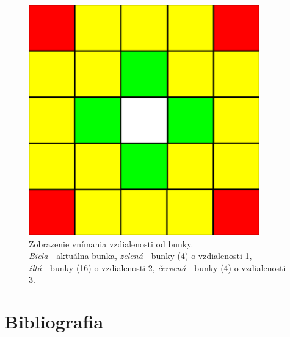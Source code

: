 \documentclass[a4paper,12pt]{article}
\begin{document}
\begin{figure}[htp]
    \centering
    \includegraphics[width=10cm]{neighbor_radius.png}
    \captionsetup{justification=centering,margin=2cm}
    \caption{Zobrazenie vnímania vzdialenosti od bunky.\\\textit{Biela} - aktuálna bunka, \textit{zelená} - bunky (4) o vzdialenosti 1,\\\textit{žltá} - bunky (16) o vzdialenosti 2, \textit{červená} - bunky (4) o vzdialenosti 3.}
    \label{fig:neighbor_radius}
\end{figure}

\newpage
\section{Bibliografia}


\nocite{CAmodel4FF}
\nocite{Pnoise}
\end{document}
